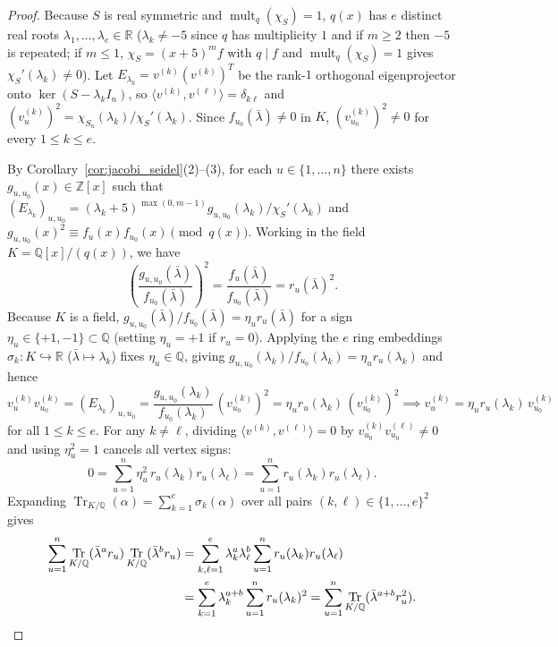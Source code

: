 \documentclass[11pt,reqno]{amsart}
\theoremstyle{definition}
\theoremstyle{remark}
\numberwithin{equation}{section}
\numberwithin{table}{section}
\DeclareMathOperator{\mult}{mult}
\DeclareMathOperator{\Tr}{Tr}
\begin{document}
\begin{proof}
Because $S$ is real symmetric and $\mult_q(\chi_S) = 1$, $q(x)$ has $e$ distinct real roots $\lambda_1, \dots, \lambda_e \in \mathbb{R}$ ($\lambda_k \neq -5$ since $q$ has multiplicity $1$ and if $m \ge 2$ then $-5$ is repeated; if $m \le 1$, $\chi_S = (x+5)^m f$ with $q \mid f$ and $\mult_q(\chi_S) = 1$ gives $\chi_S'(\lambda_k) \neq 0$). Let $E_{\lambda_k} = v^{(k)}(v^{(k)})^T$ be the rank-$1$ orthogonal eigenprojector onto $\ker(S - \lambda_k I_n)$, so $\langle v^{(k)}, v^{(\ell)} \rangle = \delta_{k\ell}$ and $(v^{(k)}_u)^2 = \chi_{S_u}(\lambda_k)/\chi_S'(\lambda_k)$. Since $f_{u_0}(\bar{\lambda}) \neq 0$ in $K$, $(v^{(k)}_{u_0})^2 \neq 0$ for every $1 \le k \le e$.

By Corollary~\ref{cor:jacobi_seidel}(2)--(3), for each $u \in \{1, \dots, n\}$ there exists $g_{u, u_0}(x) \in \mathbb{Z}[x]$ such that $(E_{\lambda_k})_{u, u_0} = (\lambda_k + 5)^{\max(0, m-1)} g_{u, u_0}(\lambda_k) / \chi_S'(\lambda_k)$ and $g_{u, u_0}(x)^2 \equiv f_u(x)f_{u_0}(x) \pmod{q(x)}$. Working in the field $K = \mathbb{Q}[x]/(q(x))$, we have
\[
  \left(\frac{g_{u, u_0}(\bar{\lambda})}{f_{u_0}(\bar{\lambda})}\right)^2 = \frac{f_u(\bar{\lambda})}{f_{u_0}(\bar{\lambda})} = r_u(\bar{\lambda})^2.
\]
Because $K$ is a field, $g_{u, u_0}(\bar{\lambda})/f_{u_0}(\bar{\lambda}) = \eta_u r_u(\bar{\lambda})$ for a sign $\eta_u \in \{+1, -1\} \subset \mathbb{Q}$ (setting $\eta_u = +1$ if $r_u = 0$). Applying the $e$ ring embeddings $\sigma_k : K \hookrightarrow \mathbb{R}$ ($\bar{\lambda} \mapsto \lambda_k$) fixes $\eta_u \in \mathbb{Q}$, giving $g_{u, u_0}(\lambda_k)/f_{u_0}(\lambda_k) = \eta_u r_u(\lambda_k)$ and hence
\[
  v^{(k)}_u v^{(k)}_{u_0} = (E_{\lambda_k})_{u, u_0} = \frac{g_{u, u_0}(\lambda_k)}{f_{u_0}(\lambda_k)}\,(v^{(k)}_{u_0})^2 = \eta_u r_u(\lambda_k)\,(v^{(k)}_{u_0})^2 \implies v^{(k)}_u = \eta_u r_u(\lambda_k)\,v^{(k)}_{u_0}
\]
for all $1 \le k \le e$. For any $k \neq \ell$, dividing $\langle v^{(k)}, v^{(\ell)} \rangle = 0$ by $v^{(k)}_{u_0} v^{(\ell)}_{u_0} \neq 0$ and using $\eta_u^2 = 1$ cancels all vertex signs:
\[
  0 = \sum_{u=1}^n \eta_u^2\,r_u(\lambda_k) r_u(\lambda_\ell) = \sum_{u=1}^n r_u(\lambda_k) r_u(\lambda_\ell).
\]
Expanding $\Tr_{K/\mathbb{Q}}(\alpha) = \sum_{k=1}^e \sigma_k(\alpha)$ over all pairs $(k, \ell) \in \{1, \dots, e\}^2$ gives
\begin{align*}
  \sum_{u=1}^n \Tr_{K/\mathbb{Q}}(\bar{\lambda}^a r_u)\Tr_{K/\mathbb{Q}}(\bar{\lambda}^b r_u)
  &= \sum_{k,\ell=1}^e \lambda_k^a \lambda_\ell^b \sum_{u=1}^n r_u(\lambda_k) r_u(\lambda_\ell) \\
  &= \sum_{k=1}^e \lambda_k^{a+b} \sum_{u=1}^n r_u(\lambda_k)^2 = \sum_{u=1}^n \Tr_{K/\mathbb{Q}}(\bar{\lambda}^{a+b} r_u^2).\qedhere
\end{align*}
\end{proof}
\end{document}
